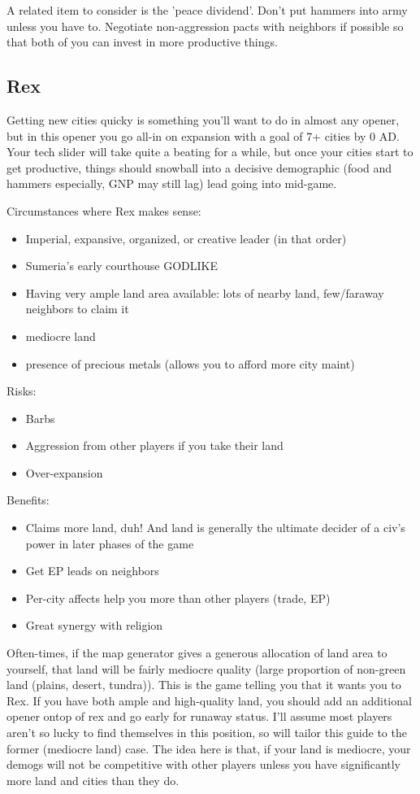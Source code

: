 \documentclass[10pt]{article}
\begin{document}
A related item to consider is the 'peace dividend'. Don't put hammers
into army unless you have to. Negotiate non-aggression pacts with
neighbors if possible so that both of you can invest in more
productive things.

\subsection*{Rex}

Getting new cities quicky is something you'll want to do in almost any
opener, but in this opener you go all-in on expansion with a goal of
7+ cities by 0 AD. Your tech slider will take quite a beating for a
while, but once your cities start to get productive, things should
snowball into a decisive demographic (food and hammers especially, GNP
may still lag) lead going into mid-game.

Circumstances where Rex makes sense:
\begin{itemize}
\item Imperial, expansive, organized, or creative leader (in that order)
\item Sumeria's early courthouse GODLIKE
\item Having very ample land area available: lots of nearby land, few/faraway neighbors to claim it
\item mediocre land
\item presence of precious metals (allows you to afford more city maint)
\end{itemize}

Risks:
\begin{itemize}
\item Barbs
\item Aggression from other players if you take their land
\item Over-expansion
\end{itemize}

Benefits:
\begin{itemize}
\item Claims more land, duh! And land is generally the ultimate decider of a civ's power in later phases of the game
\item Get EP leads on neighbors
\item Per-city affects help you more than other players (trade, EP)
\item Great synergy with religion
\end{itemize}

Often-times, if the map generator gives a generous allocation of land
area to yourself, that land will be fairly mediocre quality (large
proportion of non-green land (plains, desert, tundra)).  This is the
game telling you that it wants you to Rex. If you have both ample and
high-quality land, you should add an additional opener ontop of rex
and go early for runaway status. I'll assume most players aren't so
lucky to find themselves in this position, so will tailor this guide
to the former (mediocre land) case.  The idea here is that, if your
land is mediocre, your demogs will not be competitive with other
players unless you have significantly more land and cities than they
do.
\end{document}
